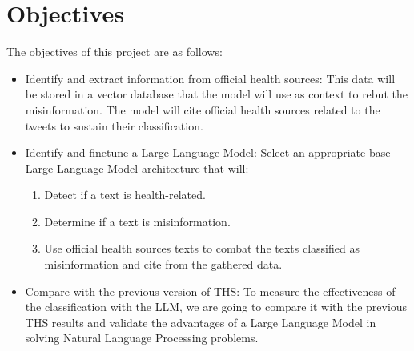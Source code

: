 \section{Objectives}

\noindent
The objectives of this project are as follows:
\begin{itemize}
	\item Identify and extract information from official health sources: This data will be stored in a vector database that the model will use as context to rebut the misinformation. The model will cite official health sources related to the tweets to sustain their classification.
	\item Identify and finetune a Large Language Model: Select an appropriate base Large Language Model architecture that will:
	\begin{enumerate}
		\item Detect if a text is health-related.
		\item Determine if a text is misinformation.
		\item Use official health sources texts to combat the texts classified as misinformation and cite from the gathered data.
	\end{enumerate}
	\item Compare with the previous version of THS: To measure the effectiveness of the classification with the LLM, we are going to compare it with the previous THS results and validate the advantages of a Large Language Model in solving Natural Language Processing problems. 
\end{itemize}

